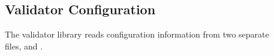                                                                                                                             
\subsection{Validator Configuration}
\label{configuration}
                                                                                                                             
The validator library reads configuration information from two separate \\
files,  and .
                                                                                                                             
